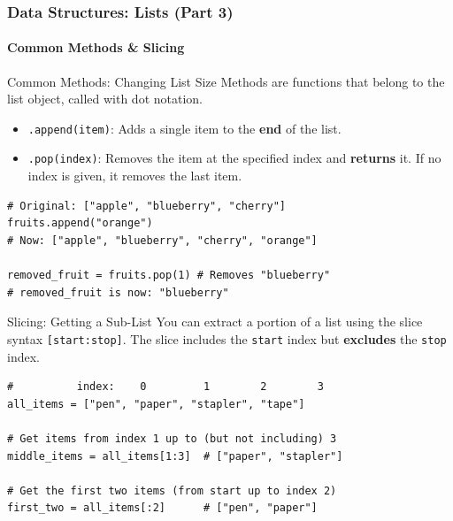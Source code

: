 \documentclass{beamer}
\begin{document}
\begin{frame}[fragile]
    \frametitle{Data Structures: Lists (Part 3)}
    \framesubtitle{Common Methods \& Slicing}

    \begin{block}{Common Methods: Changing List Size}
        Methods are functions that belong to the list object, called with dot notation.
        \begin{itemize}
            \item \texttt{.append(item)}: Adds a single item to the \textbf{end} of the list.
            \item \texttt{.pop(index)}: Removes the item at the specified index and \textbf{returns} it. If no index is given, it removes the last item.
        \end{itemize}
        \begin{verbatim}
# Original: ["apple", "blueberry", "cherry"]
fruits.append("orange")
# Now: ["apple", "blueberry", "cherry", "orange"]

removed_fruit = fruits.pop(1) # Removes "blueberry"
# removed_fruit is now: "blueberry"
        \end{verbatim}
    \end{block}

    \begin{block}{Slicing: Getting a Sub-List}
        You can extract a portion of a list using the slice syntax \texttt{[start:stop]}. The slice includes the \texttt{start} index but \textbf{excludes} the \texttt{stop} index.
        \begin{verbatim}
#          index:    0         1        2        3
all_items = ["pen", "paper", "stapler", "tape"]

# Get items from index 1 up to (but not including) 3
middle_items = all_items[1:3]  # ["paper", "stapler"]

# Get the first two items (from start up to index 2)
first_two = all_items[:2]      # ["pen", "paper"]
        \end{verbatim}
    \end{block}
\end{frame}
\end{document}
